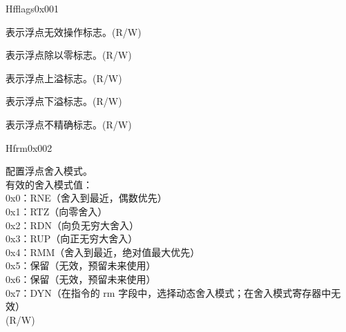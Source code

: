 \begin{register}{H}{fflags}{0x001}\label{regdesc:FFLAGS}
%
%
%
%
%
%
\regnewline%
\begin{regdesc}\begin{reglist}
\label{fielddesc:FFLAGS_NV}\item [NV] 表示浮点无效操作标志。(R/W)
\label{fielddesc:FFLAGS_DZ}\item [DZ] 表示浮点除以零标志。(R/W)
\label{fielddesc:FFLAGS_OF}\item [OF] 表示浮点上溢标志。(R/W)
\label{fielddesc:FFLAGS_UF}\item [UF] 表示浮点下溢标志。(R/W)
\label{fielddesc:FFLAGS_NX}\item [NX] 表示浮点不精确标志。(R/W)
\end{reglist}\end{regdesc}
\end{register}

\begin{register}{H}{frm}{0x002}\label{regdesc:FRM}
%
%
\regnewline%
\begin{regdesc}\begin{reglist}
\label{fielddesc:FRM}\item [FRM] 配置浮点舍入模式。\\
有效的舍入模式值：\\
0x0：RNE（舍入到最近，偶数优先）\\
0x1：RTZ（向零舍入）\\
0x2：RDN（向负无穷大舍入）\\
0x3：RUP（向正无穷大舍入）\\
0x4：RMM（舍入到最近，绝对值最大优先）\\
0x5：保留（无效，预留未来使用） \\
0x6：保留（无效，预留未来使用） \\
0x7：DYN（在指令的 rm 字段中，选择动态舍入模式；在舍入模式寄存器中无效）\\
(R/W)
\end{reglist}\end{regdesc}
\end{register}


